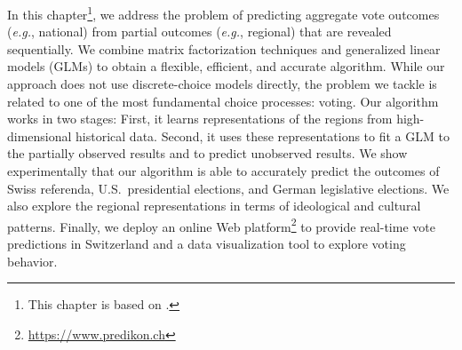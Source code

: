 
In this chapter\footnote{This chapter is based on \citet{immer2020sub}.}, we address the problem of predicting aggregate vote outcomes (\textit{e.g.}, national) from partial outcomes (\textit{e.g.}, regional) that are revealed sequentially.
We combine matrix factorization techniques and generalized linear models (GLMs) to obtain a flexible, efficient, and accurate algorithm.
While our approach does not use discrete-choice models directly, the problem we tackle is related to one of the most fundamental choice processes: voting.
Our algorithm works in two stages:
First, it learns representations of the regions from high-dimensional historical data.
Second, it uses these representations to fit a GLM to the partially observed results and to predict unobserved results.
We show experimentally that our algorithm is able to accurately predict the outcomes of Swiss referenda, U.S.\ presidential elections, and German legislative elections.
We also explore the regional representations in terms of ideological and cultural patterns.
Finally, we deploy an online Web platform\footnote{\href{https://www.predikon.ch}{https://www.predikon.ch}} to provide real-time vote predictions in Switzerland and a data visualization tool to explore voting behavior.
